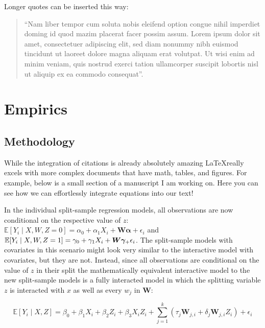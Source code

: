 \documentclass{article}
\begin{document}
Longer quotes can be inserted this way:

\begin{quote}
``Nam liber tempor cum soluta nobis eleifend option congue nihil imperdiet doming id quod mazim placerat facer possim assum. Lorem ipsum dolor sit amet, consectetuer adipiscing elit, sed diam nonummy nibh euismod tincidunt ut laoreet dolore magna aliquam erat volutpat. Ut wisi enim ad minim veniam, quis nostrud exerci tation ullamcorper suscipit lobortis nisl ut aliquip ex ea commodo consequat''\citep[p. 10]{smith2020impact}.
\end{quote}

\newpage
\section{Empirics}
\label{sec:empirics}

\subsection{Methodology}
\label{sec:methods}

While the integration of citations is already absolutely amazing \LaTeX really excels with more complex documents that have math, tables, and figures. For example, below is a small section of a manuscript I am working on. Here you can see how we can effortlessly integrate equations into our text! 


In the individual split-sample regression models, all observations are now conditional on the respective value of $z$: $\mathbb{E}[Y_{i} \mid X, W,Z = 0]  = \alpha_{0} + \alpha_{1}X_{i} + \bm{W \alpha} + \epsilon_{i}$ and $ \mathbb{E}[Y_{i} \mid X, W,Z = 1]  = \gamma_{0} + \gamma_{1}X_{i} + \bm{W\gamma_}  + \epsilon_{i}$. The split-sample models with covariates in this scenario might look very similar to the interactive model with covariates, but they are not. Instead, since all observations are conditional on the value of $z$ in their split the mathematically equivalent interactive model to the new split-sample models is a fully interacted model in which the splitting variable $z$ is interacted with $x$ as well as every $w_j$ in $\bm{W}$: \useshortskip

\begin{equation}
\label{eq:interaction_model_full}
 \mathbb{E}[Y_{i} \mid X,Z]  = \beta_{0} + \beta_{1}X_{i} + \beta_{2}Z_{i}  + \beta_{3} X_{i}Z_{i} + \sum_{j=1}^{k} (\tau_{j} \bm{W}_{j,i} + \delta_{j} \bm{W}_{j,i} Z_{i}) + \epsilon_{i}   
\end{equation}
\end{document}
